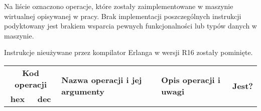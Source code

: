 Na liście oznaczono operacje, które zostały zaimplementowane w maszynie wirtualnej opisywanej w pracy. Brak implementacji poszczególnych instrukcji podyktowany jest brakiem wsparcia pewnych funkcjonalności lub typów danych w maszynie.

Instrukcje nieużywane przez kompilator Erlanga w wersji R16 zostały pominięte.

\begin{longtable}{|c|c|p{5cm}|p{6.75cm}|c|}
\hline

\multicolumn{2}{|c|}{\textbf{Kod operacji}} & \multirow{2}{*}{\textbf{Nazwa operacji i jej argumenty}} & \multirow{2}{*}{\textbf{Opis operacji i uwagi}} & \multirow{2}{*}{\textbf{Jest?}} \\
\cline{1-2}
\textbf{hex} & \textbf{dec} & & & \\
\hline
\endhead


\end{longtable}

